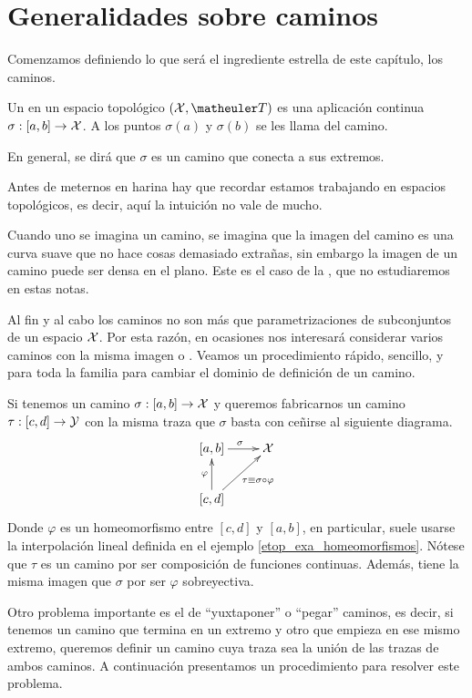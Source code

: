 \section{Generalidades sobre caminos}
Comenzamos definiendo lo que será el ingrediente estrella de este capítulo, los caminos.
\begin{defi}[Camino]
	Un  en un espacio topológico $(\X,\T)$ es una aplicación continua $\sigma:[a,b]\to\mathcal{X}$. A los puntos $\sigma(a)$ y $\sigma(b)$ se les llama  del camino.
	
	En general, se dirá que $\sigma$ es un camino que conecta a sus extremos.
\end{defi}
Antes de meternos en harina hay que recordar estamos trabajando en espacios topológicos, es decir, aquí la intuición no vale de mucho.
\begin{obs}
	Cuando uno se imagina un camino, se imagina que la imagen del camino es una curva suave que no hace cosas demasiado extrañas, sin embargo la imagen de un camino puede ser densa en el plano. Este es el caso de la , que no estudiaremos en estas notas.
\end{obs}
Al fin y al cabo los caminos no son más que parametrizaciones de subconjuntos de un espacio $\mathcal{X}$. Por esta razón, en ocasiones nos interesará considerar varios caminos con la misma imagen o . Veamos un procedimiento rápido, sencillo, y para toda la familia para cambiar el dominio de definición de un camino.
\begin{obs}[Reparametrización]
	\label{cam_obs_reparam}
	Si tenemos un camino $\sigma:[a,b]\to\mathcal{X}$ y queremos fabricarnos un camino $\tau:[c,d]\to\mathcal{Y}$ con la misma traza que $\sigma$ basta con ceñirse al siguiente diagrama.
	\begin{equation*}
		\xymatrix{
			[a,b]\ar[r]^{\sigma}& \X\\
			[c,d]\ar[u]^{\varphi}\ar[ur]_{\tau\equiv\sigma\circ\varphi}
		}
	\end{equation*}
	Donde $\varphi$ es un homeomorfismo entre $[c,d]$ y $[a,b]$, en particular, suele usarse la interpolación lineal definida en el ejemplo \ref{etop_exa_homeomorfismos}. Nótese que $\tau$ es un camino por ser composición de funciones continuas. Además, tiene la misma imagen que $\sigma$ por ser $\varphi$ sobreyectiva.
\end{obs}
Otro problema importante es el de ``yuxtaponer'' o ``pegar'' caminos, es decir, si tenemos un camino que termina en un extremo y otro que empieza en ese mismo extremo, queremos definir un camino cuya traza sea la unión de las trazas de ambos caminos. A continuación presentamos un procedimiento para resolver este problema.
